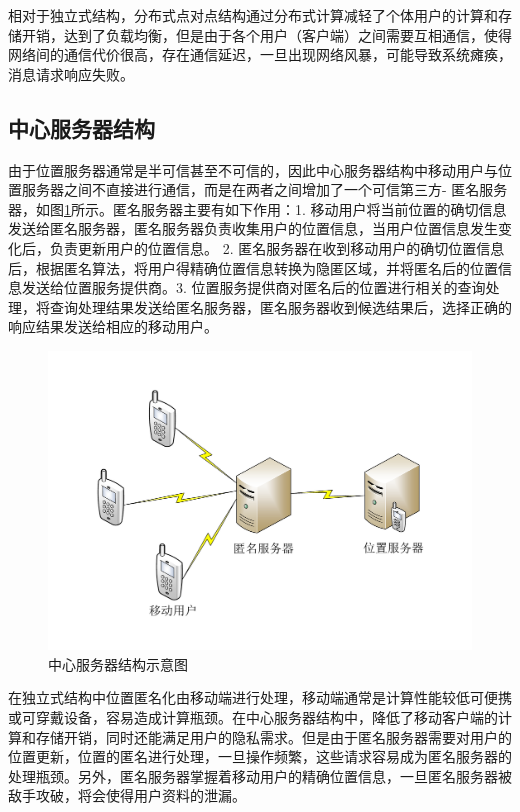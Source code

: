 相对于独立式结构，分布式点对点结构通过分布式计算减轻了个体用户的计算和存储开销，达到了负载均衡，但是由于各个用户（客户端）之间需要互相通信，使得网络间的通信代价很高，存在通信延迟，一旦出现网络风暴，可能导致系统瘫痪，消息请求响应失败。


\subsection{中心服务器结构}
由于位置服务器通常是半可信甚至不可信的，因此中心服务器结构中移动用户与位置服务器之间不直接进行通信，而是在两者之间增加了一个可信第三方- 匿名服务器，如图\ref{fig:centralized_pdf}所示。匿名服务器主要有如下作用：1. 移动用户将当前位置的确切信息发送给匿名服务器，匿名服务器负责收集用户的位置信息，当用户位置信息发生变化后，负责更新用户的位置信息。 2. 匿名服务器在收到移动用户的确切位置信息后，根据匿名算法，将用户得精确位置信息转换为隐匿区域，并将匿名后的位置信息发送给位置服务提供商。3. 位置服务提供商对匿名后的位置进行相关的查询处理，将查询处理结果发送给匿名服务器，匿名服务器收到候选结果后，选择正确的响应结果发送给相应的移动用户。

\begin{figure}[H]
\centering
\includegraphics[width=12cm]{fig/centralized.pdf}
\caption{中心服务器结构示意图} %
\label{fig:centralized_pdf}
\end{figure}

在独立式结构中位置匿名化由移动端进行处理，移动端通常是计算性能较低可便携或可穿戴设备，容易造成计算瓶颈。在中心服务器结构中，降低了移动客户端的计算和存储开销，同时还能满足用户的隐私需求。但是由于匿名服务器需要对用户的位置更新，位置的匿名进行处理，一旦操作频繁，这些请求容易成为匿名服务器的处理瓶颈。另外，匿名服务器掌握着移动用户的精确位置信息，一旦匿名服务器被敌手攻破，将会使得用户资料的泄漏。

